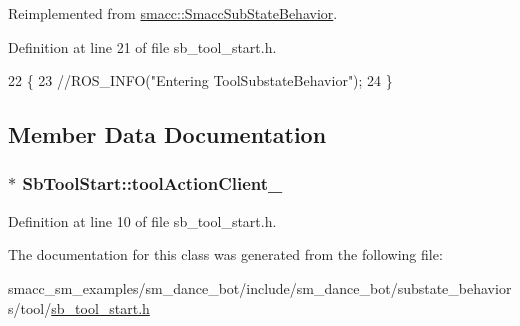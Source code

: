Reimplemented from \hyperlink{classsmacc_1_1SmaccSubStateBehavior_a1f87ab55c1805b2a2fd9c022807d35b9}{smacc\+::\+Smacc\+Sub\+State\+Behavior}.



Definition at line 21 of file sb\+\_\+tool\+\_\+start.\+h.


\begin{DoxyCode}
22     \{
23       \textcolor{comment}{//ROS\_INFO("Entering ToolSubstateBehavior");}
24     \}
\end{DoxyCode}


\subsection{Member Data Documentation}
\subsubsection[{\texorpdfstring{tool\+Action\+Client\+\_\+}{toolActionClient_}}]{$\ast$ Sb\+Tool\+Start\+::tool\+Action\+Client\+\_\+}\hypertarget{classSbToolStart_ade218adc9ad0c00accf947dffdcd1a33}{}\label{classSbToolStart_ade218adc9ad0c00accf947dffdcd1a33}


Definition at line 10 of file sb\+\_\+tool\+\_\+start.\+h.



The documentation for this class was generated from the following file\+:\begin{DoxyCompactItemize}
\item 
smacc\+\_\+sm\+\_\+examples/sm\+\_\+dance\+\_\+bot/include/sm\+\_\+dance\+\_\+bot/substate\+\_\+behaviors/tool/\hyperlink{sb__tool__start_8h}{sb\+\_\+tool\+\_\+start.\+h}\end{DoxyCompactItemize}
